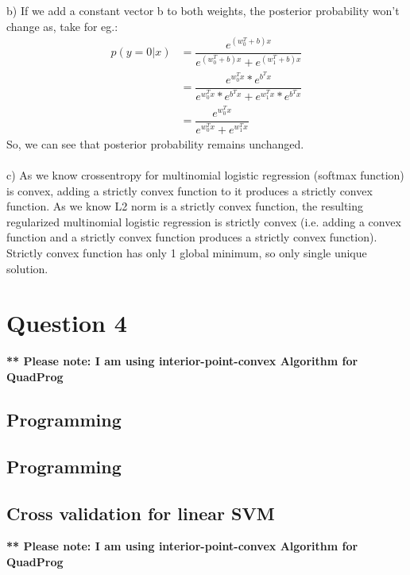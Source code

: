 \documentclass[paper=a4, fontsize=11pt]{scrartcl} %
\numberwithin{equation}{section} %
\numberwithin{figure}{section} %
\numberwithin{table}{section} %
\begin{document}
b) If we add a constant vector b to both weights, the posterior probability won't change as, take for eg.:
\begin{align*}
p(y=0|x) &= \dfrac{e^{(w_{0}^{T}+b)x}}{e^{(w_{0}^{T}+b)x} + e^{(w_{1}^{T}+b)x}}\\
&= \dfrac{e^{w_{0}^{T}x}*e^{b^{T}x}}{e^{w_{0}^{T}x}*e^{b^{T}x} + e^{w_{1}^{T}x}*e^{b^{T}x}}\\ 
&= \dfrac{e^{w_{0}^{T}x}}{e^{w_{0}^{T}x} + e^{w_{1}^{T}x}}
\end{align*}
So, we can see that posterior probability remains unchanged.\\\\

c) As we know crossentropy for multinomial logistic regression (softmax function) is convex, adding a strictly convex function to it produces a strictly convex function. As we know L2 norm is a strictly convex function, the resulting regularized multinomial logistic regression is strictly convex (i.e. adding a convex function and a strictly convex function produces a strictly convex function).\\

Strictly convex function has only 1 global minimum, so only single unique solution.

\endgroup



\section{Question 4}
\textbf{** Please note: I am using interior-point-convex Algorithm for QuadProg}
\subsection{Programming}
\subsection{Programming}
\subsection{Cross validation for linear SVM}

\textbf{** Please note: I am using interior-point-convex Algorithm for QuadProg}\\
\end{document}
